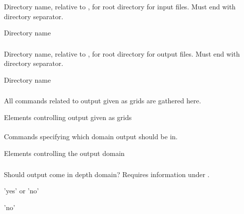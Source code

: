\subsubsection{} 
 \slist
   \item \Description Directory name, relative to , for root directory for input files. Must end with directory separator.
   \item \Argument Directory name
   \item \Default
 \elist

\subsubsection{} 
 \slist
   \item \Description Directory name, relative to , for root directory for output files. Must end with directory separator.
   \item \Argument Directory name
   \item \Default
 \elist


\subsubsection{}
 \slist
   \item \Description All commands related to output given as grids are gathered here.
   \item \Argument Elements controlling output given as grids
   \item \Default
 \elist

\paragraph{}
 \slist
   \item \Description Commands specifying which domain output should be in.
   \item \Argument Elements controlling the output domain
   \item \Default
 \elist

\subparagraph{}
 \slist
   \item \Description Should output come in depth domain? Requires information under .
   \item \Argument 'yes' or 'no'
   \item \Default 'no'
 \elist

